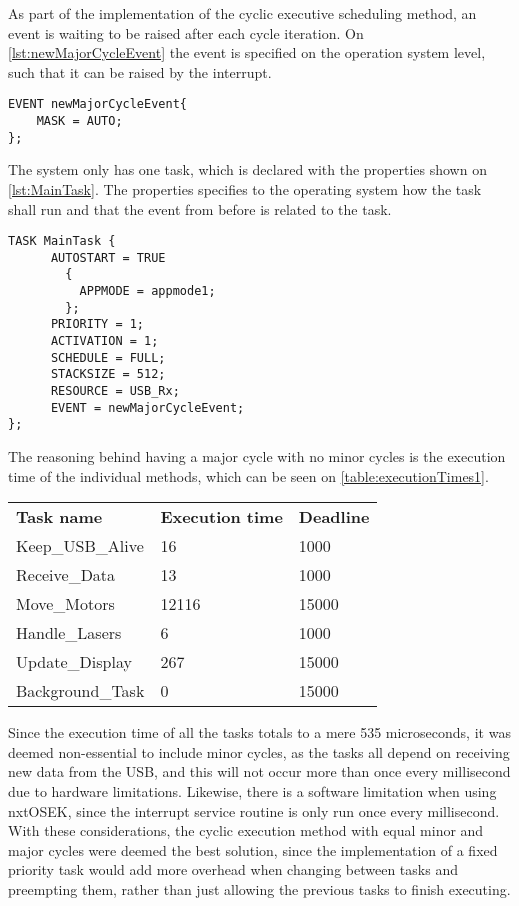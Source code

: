As part of the implementation of the cyclic executive scheduling method, an event is waiting to be raised after each cycle iteration.
On \autoref{lst:newMajorCycleEvent} the event is specified on the operation system level, such that it can be raised by the interrupt.
\begin{lstlisting}[language=CSharp,label={lst:newMajorCycleEvent},caption={newMajorCycleEvent event from nxt.oil}]
EVENT newMajorCycleEvent{
    MASK = AUTO;
};
\end{lstlisting}

The system only has one task, which is declared with the properties shown on \autoref{lst:MainTask}.
The properties specifies to the operating system how the task shall run and that the event from before is related to the task.
\begin{lstlisting}[language=CSharp,label={lst:MainTaskoil},caption={MainTaks task from nxt.oil}]
    TASK MainTask {
      AUTOSTART = TRUE
        {
          APPMODE = appmode1;
        };
      PRIORITY = 1;
      ACTIVATION = 1;
      SCHEDULE = FULL;
      STACKSIZE = 512;
      RESOURCE = USB_Rx;
      EVENT = newMajorCycleEvent;
};
\end{lstlisting}

The reasoning behind having a major cycle with no minor cycles is the execution time of the individual methods, which can be seen on \autoref{table:executionTimes1}.

\begin{table}[H]
\begin{tabular}{lll}
\textbf{Task name}  & \textbf{Execution time} & \textbf{Deadline} \\
Keep\_USB\_Alive    & 16     	& 1000                    \\
Receive\_Data       & 13       & 1000                    \\
Move\_Motors        & 12116    & 15000                   \\
Handle\_Lasers      & 6        & 1000                    \\
Update\_Display     & 267      & 15000                   \\
Background\_Task	 & 0	    & 15000					   \\
\end{tabular}
\end{table}\label{table:executionTimes1}

Since the execution time of all the tasks totals to a mere 535 microseconds, it was deemed non-essential to include minor cycles, as the tasks all depend on receiving new data from the USB, and this will not occur more than once every millisecond due to hardware limitations.
Likewise, there is a software limitation when using nxtOSEK, since the interrupt service routine is only run once every millisecond.
With these considerations, the cyclic execution method with equal minor and major cycles were deemed the best solution, since the implementation of a fixed priority task would add more overhead when changing between tasks and preempting them, rather than just allowing the previous tasks to finish executing.

